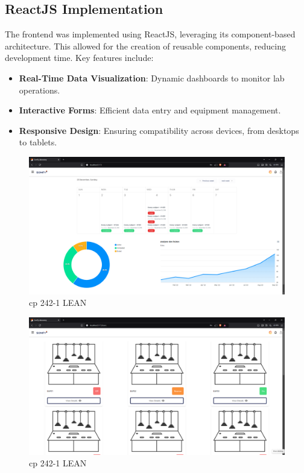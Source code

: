 \subsection{ReactJS Implementation}
The frontend was implemented using ReactJS, leveraging its component-based architecture. This allowed for the creation of reusable components, reducing development time. Key features include:
\begin{itemize}
    \item \textbf{Real-Time Data Visualization}: Dynamic dashboards to monitor lab operations.
    \item \textbf{Interactive Forms}: Efficient data entry and equipment management.
    \item \textbf{Responsive Design}: Ensuring compatibility across devices, from desktops to tablets.
\end{itemize}


\begin{figure}[H]
    \centering
    \includegraphics[width=1\textwidth]{chapters/3/img/2.png}
    \caption{cp 242-1 LEAN}
    \label{fig:campus}
\end{figure}


\begin{figure}[H]
    \centering
    \includegraphics[width=1\textwidth]{chapters/3/img/6.png}
    \caption{cp 242-1 LEAN}
    \label{fig:campus}
\end{figure}








